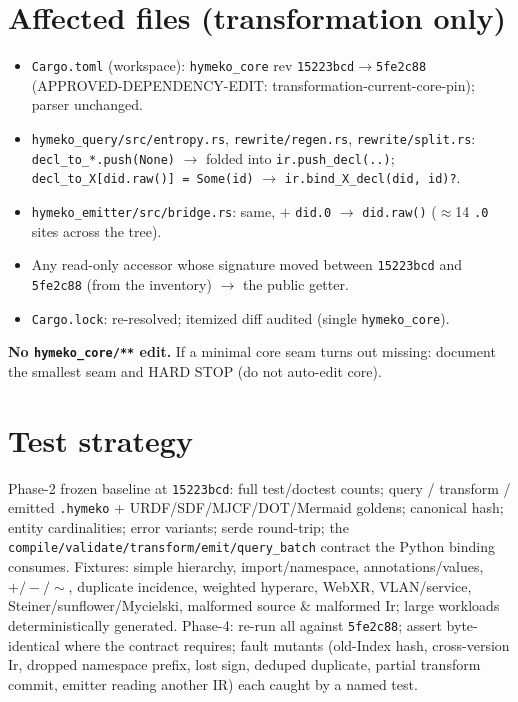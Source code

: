 \documentclass[11pt]{article}
\begin{document}
\section{Affected files (transformation only)}
\begin{itemize}
  \item \texttt{Cargo.toml} (workspace): \texttt{hymeko\_core} rev \texttt{15223bcd}$\to$\texttt{5fe2c88}
        (APPROVED-DEPENDENCY-EDIT: transformation-current-core-pin); parser unchanged.
  \item \texttt{hymeko\_query/src/entropy.rs}, \texttt{rewrite/regen.rs}, \texttt{rewrite/split.rs}:
        \texttt{decl\_to\_*.push(None)} $\to$ folded into \texttt{ir.push\_decl(..)};
        \texttt{decl\_to\_X[did.raw()] = Some(id)} $\to$ \texttt{ir.bind\_X\_decl(did, id)?}.
  \item \texttt{hymeko\_emitter/src/bridge.rs}: same, $+$ \texttt{did.0} $\to$ \texttt{did.raw()}
        ($\approx$14 \texttt{.0} sites across the tree).
  \item Any read-only accessor whose signature moved between \texttt{15223bcd} and \texttt{5fe2c88}
        (from the inventory) $\to$ the public getter.
  \item \texttt{Cargo.lock}: re-resolved; itemized diff audited (single \texttt{hymeko\_core}).
\end{itemize}
\textbf{No \texttt{hymeko\_core/**} edit.} If a minimal core seam turns out missing: document the
smallest seam and HARD STOP (do not auto-edit core).

\section{Test strategy}
Phase-2 frozen baseline at \texttt{15223bcd}: full test/doctest counts; query / transform / emitted
\texttt{.hymeko} + URDF/SDF/MJCF/DOT/Mermaid goldens; canonical hash; entity cardinalities; error
variants; serde round-trip; the \texttt{compile/validate/transform/emit/query\_batch} contract the
Python binding consumes. Fixtures: simple hierarchy, import/namespace, annotations/values,
$+/-/\sim$, duplicate incidence, weighted hyperarc, WebXR, VLAN/service, Steiner/sunflower/Mycielski,
malformed source \& malformed Ir; large workloads deterministically generated. Phase-4: re-run all
against \texttt{5fe2c88}; assert byte-identical where the contract requires; fault mutants
(old-Index hash, cross-version Ir, dropped namespace prefix, lost sign, deduped duplicate, partial
transform commit, emitter reading another IR) each caught by a named test.
\end{document}
